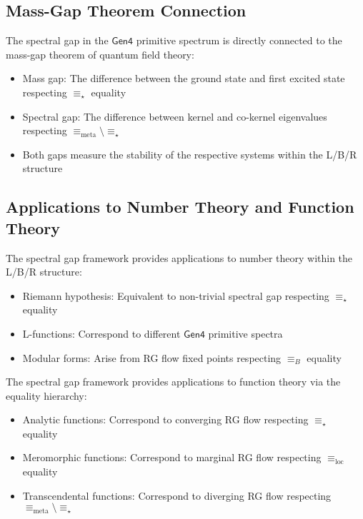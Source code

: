 \subsection{Mass-Gap Theorem Connection}

\begin{remark}
\label{rem:mass-gap-spectral-g6}
The spectral gap in the $\mathsf{Gen4}$ primitive spectrum is directly connected to the mass-gap theorem of quantum field theory:
\begin{itemize}
\item Mass gap: The difference between the ground state and first excited state respecting $\equiv_\star$ equality
\item Spectral gap: The difference between kernel and co-kernel eigenvalues respecting $\equiv_{\text{meta}} \setminus \equiv_\star$
\item Both gaps measure the stability of the respective systems within the L/B/R structure
\end{itemize}
\end{remark}

\subsection{Applications to Number Theory and Function Theory}

\begin{theorem}
\label{thm:number-theory-lbr}
The spectral gap framework provides applications to number theory within the L/B/R structure:
\begin{itemize}
\item Riemann hypothesis: Equivalent to non-trivial spectral gap respecting $\equiv_\star$ equality
\item L-functions: Correspond to different $\mathsf{Gen4}$ primitive spectra
\item Modular forms: Arise from RG flow fixed points respecting $\equiv_B$ equality
\end{itemize}
\end{theorem}

\begin{theorem}
\label{thm:function-theory-lbr}
The spectral gap framework provides applications to function theory via the equality hierarchy:
\begin{itemize}
\item Analytic functions: Correspond to converging RG flow respecting $\equiv_\star$ equality
\item Meromorphic functions: Correspond to marginal RG flow respecting $\equiv_{\text{loc}}$ equality
\item Transcendental functions: Correspond to diverging RG flow respecting $\equiv_{\text{meta}} \setminus \equiv_\star$
\end{itemize}
\end{theorem}

